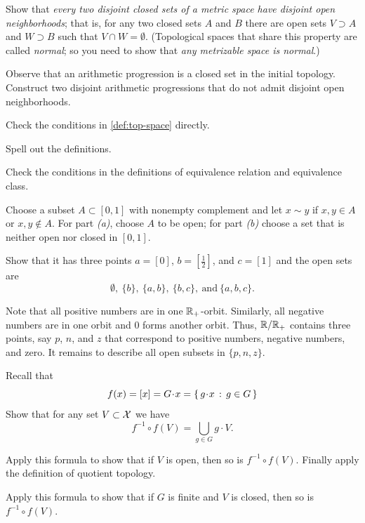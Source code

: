 Show that \textit{every two disjoint closed sets of a metric space have disjoint open neighborhoods};
that is, for any two closed sets $A$ and $B$ there are open sets $V\supset A$ and $W\supset B$ such that $V\cap W=\emptyset$.
(Topological spaces that share this property are called \emph{normal};
so you need to show that \textit{any metrizable space is normal}.)

Observe that an arithmetic progression is a closed set in the initial topology.
Construct two disjoint arithmetic progressions that do not admit disjoint open neighborhoods. 

 Check the conditions in \ref{def:top-space} directly.

 Spell out the definitions.

Check the conditions in the definitions of equivalence relation and equivalence class.

Choose a subset $A\subset [0,1]$ with nonempty complement and let $x\sim y$ if $x,y\in A$ or $x,y\notin A$.
For part \textit{(a)}, choose $A$ to be open; for part \textit{(b)} choose a set that is neither open nor closed in $[0,1]$.

Show that it has three points $a=[0]$, $b=[\tfrac12]$, and $c=[1]$ and the open sets are
\[\emptyset,\  \{b\},\ \{a,b\},\ \{b,c\},\ \text{and}\ \{a,b,c\}.\]

Note that all positive numbers are in one $\mathbb{R}_+$-orbit.
Similarly, all negative numbers are in one orbit and $0$ forms another orbit.
Thus, $\mathbb{R}/\mathbb{R}_+$ contains three points, say $p$, $n$, and $z$ that correspond to positive numbers, negative numbers, and zero.
It remains to describe all open subsets in $\{p,n,z\}$.

Recall that
\[f(x)=[x]=G\cdot x=\set{g\cdot x}{g\in G}\]
Show that for any set $V\subset \mathcal{X}$ we have
\[f^{-1}\circ f(V)=\bigcup_{g\in G}g\cdot V.\]

Apply this formula to show that if $V$ is open, then so is $f^{-1}\circ f(V)$.
Finally apply the definition of quotient topology.

Apply this formula to show that if $G$ is finite and $V$ is closed, then so is $f^{-1}\circ f(V)$.

